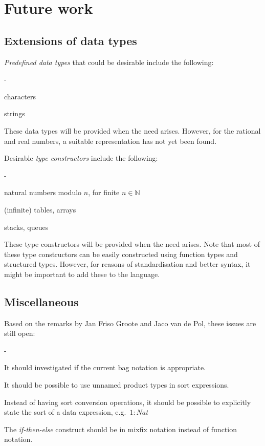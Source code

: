 \documentclass[a4paper,fleqn]{article}
\newenvironment{tdefinitions}[2][0.15em]
  {\begin{list}%
    {#2}%
    {\setlength{\parsep}{0pt}%
     \setlength{\itemsep}{#1}%
     \setlength{\leftmargin}{\mathindent}%
     \setlength{\labelwidth}{\mathindent - \labelsep}%
    }
  }
  {\end{list}}
\newcommand{\frm}[1]{\mbox{\ensuremath{#1}}}
\newcommand{\f}[1]{\ensuremath{\mathit{#1}}}
\newcommand{\nat}{\ensuremath{\mathbb{N}}}
\newlength{\tlength}
\begin{document}
\section{Future work}

\subsection{Extensions of data types}

\emph{Predefined data types} that could be desirable include the following:
\begin{tdefinitions}{-}
\item characters
\item strings
\end{tdefinitions}

\noindent
These data types will be provided when the need arises. However, for the
rational and real numbers, a suitable representation has not yet been found.

Desirable \emph{type constructors} include the following:
\begin{tdefinitions}{-}
\item natural numbers modulo \frm{n}, for finite \frm{n \in \nat}
\item (infinite) tables, arrays
\item stacks, queues
\end{tdefinitions}

\noindent
These type constructors will be provided when the need arises. Note that most
of these type constructors can be easily constructed using function types and
structured types. However, for reasons of standardisation and better syntax, it
might be important to add these to the language.

\subsection{Miscellaneous}

Based on the remarks by Jan Friso Groote and Jaco van de Pol, these issues are
still open:
\begin{tdefinitions}{-}
\item It should investigated if the current bag notation is appropriate.
\item It should be possible to use unnamed product types in sort expressions.
\item Instead of having sort conversion operations, it should be possible to
explicitly state the sort of a data expression, e.g.\ \frm{1: \f{Nat}}
\item The \emph{if-then-else} construct should be in mixfix notation instead of
function notation.
\end{tdefinitions}
\end{document}
